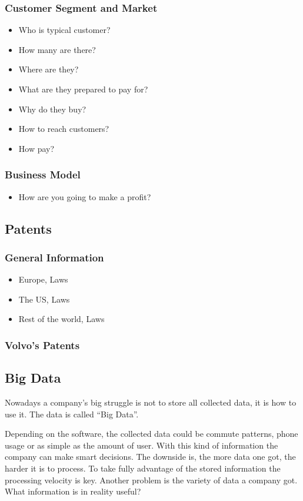 \documentclass[conference]{IEEEtran}
\begin{document}
\subsubsection{Customer Segment and Market}
\begin{itemize}
	\item Who is typical customer?
	\item How many are there?
	\item Where are they?
	\item  What are they prepared to pay for?
	\item Why do they buy?
	\item How to reach customers?
	\item How pay?
\end{itemize}
\subsubsection{Business Model}
\begin{itemize}
	\item How are you going to make a profit?
\end{itemize}
\subsection{Patents}
\subsubsection{General Information}
\begin{itemize}
	\item Europe, Laws
	\item The US, Laws
	\item Rest of the world, Laws
\end{itemize}
\subsubsection{Volvo's Patents}
\subsection{Big Data}
Nowadays a company's big struggle is not to store all collected data, it is how to use it. The data is called ``Big Data''. \cite{ExploitBigData}

Depending on the software, the collected data could be commute patterns, phone usage or as simple as the amount of user. With this kind of information the company can make smart decisions. The downside is, the more data one got, the harder it is to process. To take fully advantage of the stored information the processing velocity is key. Another problem is the variety of data a company got. What information is in reality useful? \cite{SpeedDataEco} %
\end{document}
